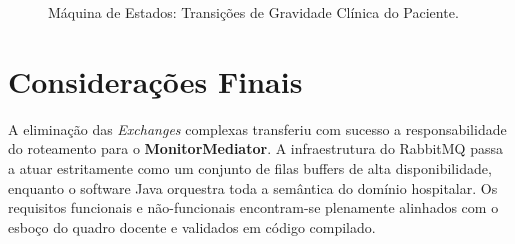 \documentclass[12pt,a4paper]{article}
\begin{document}
\begin{figure}[h!]
\caption{Máquina de Estados: Transições de Gravidade Clínica do Paciente.}
\label{fig:diagrama_estados}
\end{figure}

\section{Considerações Finais}
A eliminação das \textit{Exchanges} complexas transferiu com sucesso a responsabilidade do roteamento para o \textbf{MonitorMediator}. A infraestrutura do RabbitMQ passa a atuar estritamente como um conjunto de filas buffers de alta disponibilidade, enquanto o software Java orquestra toda a semântica do domínio hospitalar. Os requisitos funcionais e não-funcionais encontram-se plenamente alinhados com o esboço do quadro docente e validados em código compilado.
\end{document}
